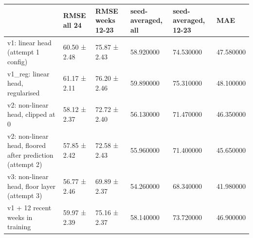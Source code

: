 \begin{tabular}{llllll}
\toprule
 & RMSE all 24 & RMSE weeks 12-23 & seed-averaged, all & seed-averaged, 12-23 & MAE \\
\midrule
v1: linear head (attempt 1 config) & 60.50 ± 2.48 & 75.87 ± 2.43 & 58.920000 & 74.530000 & 47.580000 \\
v1_reg: linear head, regularised & 61.17 ± 2.11 & 76.20 ± 2.46 & 59.890000 & 75.310000 & 48.100000 \\
v2: non-linear head, clipped at 0 & 58.12 ± 2.37 & 72.72 ± 2.40 & 56.130000 & 71.470000 & 46.350000 \\
v2: non-linear head, floored after prediction (attempt 2) & 57.85 ± 2.42 & 72.58 ± 2.43 & 55.960000 & 71.400000 & 45.650000 \\
v3: non-linear head, floor layer (attempt 3) & 56.77 ± 2.46 & 69.89 ± 2.37 & 54.260000 & 68.340000 & 41.980000 \\
v1 + 12 recent weeks in training & 59.97 ± 2.39 & 75.16 ± 2.37 & 58.140000 & 73.720000 & 46.900000 \\
\bottomrule
\end{tabular}
